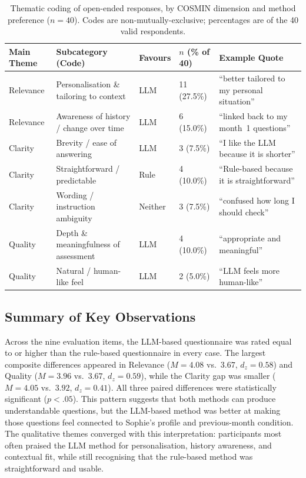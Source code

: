\documentclass[conference]{IEEEtran}
\begin{document}
\begin{table}[t]
\caption{Thematic coding of open-ended responses, by COSMIN dimension and method preference ($n=40$). Codes are non-mutually-exclusive; percentages are of the 40 valid respondents.}
\label{tab:qual_preference}
\centering
\small
\begin{tabular}{@{}llllp{4.8cm}@{}}
\toprule
\textbf{Main Theme} & \textbf{Subcategory (Code)} & \textbf{Favours} & \textbf{$n$ (\% of 40)} & \textbf{Example Quote} \\
\midrule
Relevance & Personalisation \& tailoring to context       & LLM     & 11 (27.5\%) & ``better tailored to my personal situation'' \\
Relevance & Awareness of history / change over time        & LLM     &  6 (15.0\%) & ``linked back to my month~1 questions'' \\
\addlinespace
Clarity   & Brevity / ease of answering                   & LLM     &  3 (7.5\%)  & ``I like the LLM because it is shorter'' \\
Clarity   & Straightforward / predictable                  & Rule    &  4 (10.0\%) & ``Rule-based because it is straightforward'' \\
Clarity   & Wording / instruction ambiguity                & Neither &  3 (7.5\%)  & ``confused how long I should check'' \\
\addlinespace
Quality   & Depth \& meaningfulness of assessment          & LLM     &  4 (10.0\%) & ``appropriate and meaningful'' \\
Quality   & Natural / human-like feel                      & LLM     &  2 (5.0\%)  & ``LLM feels more human-like'' \\
\bottomrule
\end{tabular}
\end{table}


\subsection{Summary of Key Observations}
\label{subsec:summary}

Across the nine evaluation items, the LLM-based questionnaire was rated equal
to or higher than the rule-based questionnaire in every case. The largest
composite differences appeared in Relevance ($M=4.08$ vs.\ $3.67$,
$d_z=0.58$) and Quality ($M=3.96$ vs.\ $3.67$, $d_z=0.59$), while the
Clarity gap was smaller ($M=4.05$ vs.\ $3.92$, $d_z=0.41$). All three
paired differences were statistically significant ($p<.05$). This pattern suggests that both methods can produce understandable
questions, but the LLM-based method was better at making those questions feel
connected to Sophie's profile and previous-month condition. The qualitative
themes converged with this interpretation: participants most often praised the
LLM method for personalisation, history awareness, and contextual fit, while
still recognising that the rule-based method was straightforward and usable.
\end{document}
